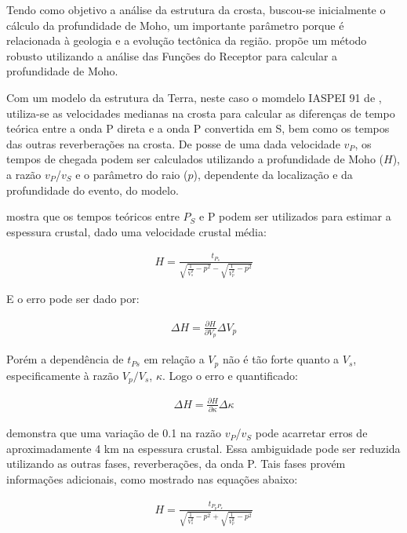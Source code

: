 Tendo como objetivo a análise da estrutura da crosta, buscou-se inicialmente o cálculo da profundidade de Moho, um importante parâmetro porque é relacionada à geologia e a evolução tectônica da região. \cite{Zhu_Kanamori_2000} propõe um método robusto utilizando a análise das Funções do Receptor para calcular a profundidade de Moho.

Com um modelo da estrutura da Terra, neste caso o momdelo IASPEI 91 de \cite{kennet_iaspei_1991}, utiliza-se as velocidades medianas na crosta para calcular as diferenças de tempo teórica entre a onda P direta e a onda P convertida em S, bem como os tempos das outras reverberações na crosta. De posse de uma dada velocidade $v_{P}$, os tempos de chegada podem ser calculados utilizando a profundidade de Moho ($H$), a razão $v_{P}$/$v_{S}$ e o parâmetro do raio ($p$), dependente da localização e da profundidade  do evento, do modelo.

\cite{Zhu_Kanamori_2000} mostra que os tempos teóricos entre $P_{S}$ e P podem ser utilizados para estimar a espessura crustal, dado uma velocidade crustal média:

\begin{eqnarray}
H = {\frac{t_{P_{s}}}{{\sqrt{\frac{1}{V_{s}^{2}} - p^{2}}} - \sqrt{\frac{1}{V_{p}^{2}} - p^{2}}}}
\end{eqnarray}

E o erro pode ser dado por:

\begin{eqnarray}
\Delta H = \frac{\partial H}{\partial V_{p}} \Delta V_{p}
\end{eqnarray}

Porém a dependência de $t_{Ps}$ em relação a $V_{p}$ não é tão forte quanto a $V_{s}$, especificamente à razão $V_{p}/V_{s}$, $\kappa$. Logo o erro e quantificado:

\begin{eqnarray}
\Delta H = \frac{\partial H}{\partial \kappa } \Delta \kappa 
\end{eqnarray}

\cite{Zhu_Kanamori_2000} demonstra que uma variação de 0.1 na razão $v_{P}$/$v_{S}$ pode acarretar erros de aproximadamente 4 km na espessura crustal. Essa ambiguidade pode ser reduzida utilizando as outras fases, reverberações, da onda P. Tais fases provém informações adicionais, como mostrado nas equações abaixo:

\begin{eqnarray}
H = {\frac{t_{P_{p}P_{s}}}{{\sqrt{\frac{1}{V_{s}^{2}} - p^{2}}} + \sqrt{\frac{1}{V_{p}^{2}} - p^{2}}}}
\end{eqnarray}

